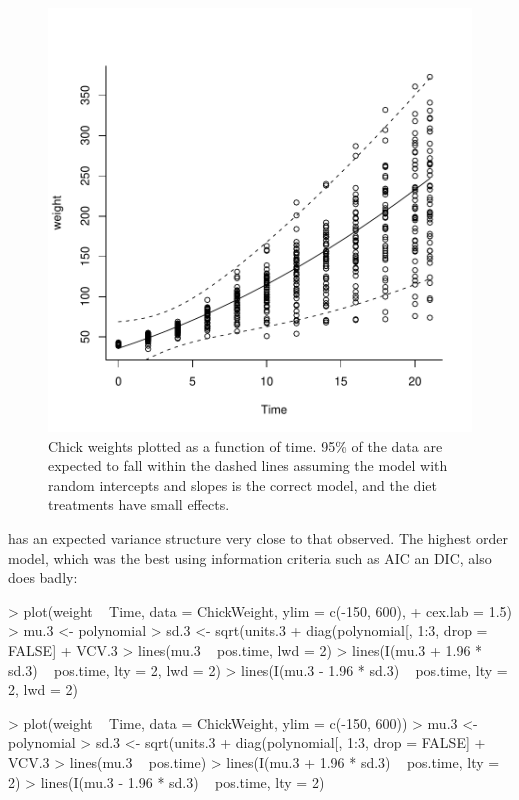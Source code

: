 \documentclass{article}
\begin{document}
\begin{figure}[!h]
\begin{center}
\includegraphics{Lecture4-037}
\end{center}
\caption{Chick weights plotted as a function of time. 95\% of the data are expected to fall within the dashed lines assuming the model with random intercepts and slopes is the correct model, and the diet treatments have small effects.}
\label{VCVpred.2-fig}
\end{figure}

has an expected variance structure very close to that observed. The highest order model, which was the best using information criteria such as AIC an DIC, also does badly: 

\iftalk
\begin{Schunk}
\begin{Sinput}
> plot(weight ~ Time, data = ChickWeight, ylim = c(-150, 600), 
+     cex.lab = 1.5)
> mu.3 <- polynomial %
> sd.3 <- sqrt(units.3 + diag(polynomial[, 1:3, drop = FALSE] %
+     VCV.3 %
> lines(mu.3 ~ pos.time, lwd = 2)
> lines(I(mu.3 + 1.96 * sd.3) ~ pos.time, lty = 2, lwd = 2)
> lines(I(mu.3 - 1.96 * sd.3) ~ pos.time, lty = 2, lwd = 2)
\end{Sinput}
\end{Schunk}
\else
\begin{Schunk}
\begin{Sinput}
> plot(weight ~ Time, data = ChickWeight, ylim = c(-150, 600))
> mu.3 <- polynomial %
> sd.3 <- sqrt(units.3 + diag(polynomial[, 1:3, drop = FALSE] %
+     VCV.3 %
> lines(mu.3 ~ pos.time)
> lines(I(mu.3 + 1.96 * sd.3) ~ pos.time, lty = 2)
> lines(I(mu.3 - 1.96 * sd.3) ~ pos.time, lty = 2)
\end{Sinput}
\end{Schunk}
\fi
\end{document}
